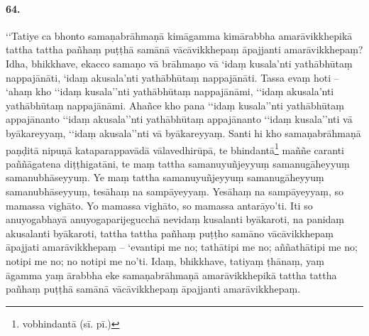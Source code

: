 \paragraph{64.}
‘‘Tatiye ca bhonto samaṇabrāhmaṇā kimāgamma kimārabbha amarāvikkhepikā tattha tattha pañhaṃ puṭṭhā samānā vācāvikkhepaṃ āpajjanti amarāvikkhepaṃ? Idha, bhikkhave, ekacco samaṇo vā brāhmaṇo vā ‘idaṃ kusala’nti yathābhūtaṃ nappajānāti, ‘idaṃ akusala’nti yathābhūtaṃ nappajānāti. Tassa evaṃ hoti – ‘ahaṃ kho ‘‘idaṃ kusala’’nti yathābhūtaṃ nappajānāmi, ‘‘idaṃ akusala’nti yathābhūtaṃ nappajānāmi. Ahañce kho pana ‘‘idaṃ kusala’’nti yathābhūtaṃ appajānanto ‘‘idaṃ akusala’’nti yathābhūtaṃ appajānanto ‘‘idaṃ kusala’’nti vā byākareyyaṃ, ‘‘idaṃ akusala’’nti vā byākareyyaṃ. Santi hi kho samaṇabrāhmaṇā paṇḍitā nipuṇā kataparappavādā vālavedhirūpā, te bhindantā\footnote{vobhindantā (sī. pī.)} maññe caranti paññāgatena diṭṭhigatāni, te maṃ tattha samanuyuñjeyyuṃ samanugāheyyuṃ samanubhāseyyuṃ. Ye maṃ tattha samanuyuñjeyyuṃ samanugāheyyuṃ samanubhāseyyuṃ, tesāhaṃ na sampāyeyyaṃ. Yesāhaṃ na sampāyeyyaṃ, so mamassa vighāto. Yo mamassa vighāto, so mamassa antarāyo’ti. Iti so anuyogabhayā anuyogaparijegucchā nevidaṃ kusalanti byākaroti, na panidaṃ akusalanti byākaroti, tattha tattha pañhaṃ puṭṭho samāno vācāvikkhepaṃ āpajjati amarāvikkhepaṃ – ‘evantipi me no; tathātipi me no; aññathātipi me no; notipi me no; no notipi me no’ti. Idaṃ, bhikkhave, tatiyaṃ ṭhānaṃ, yaṃ āgamma yaṃ ārabbha eke samaṇabrāhmaṇā amarāvikkhepikā tattha tattha pañhaṃ puṭṭhā samānā vācāvikkhepaṃ āpajjanti amarāvikkhepaṃ.


